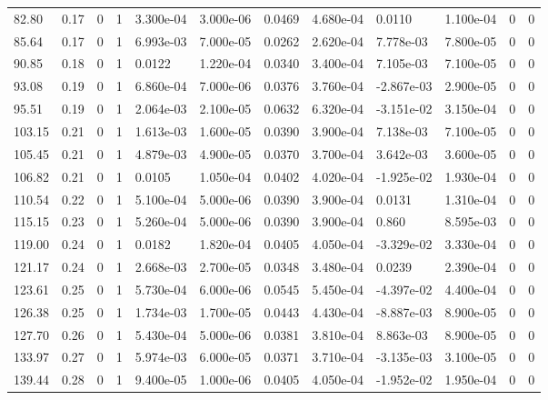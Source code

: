 \documentclass[preview]{standalone}
\begin{document}
{{{{{{{{{{{{{\begin{tabular}{L{1.2cm}C{1.2cm} C{0.3cm}C{0.5cm} C{1.4cm}C{1.4cm} C{1.4cm}C{1.4cm} C{1.6cm}C{1.6cm} C{1.6cm}C{1.6cm}}
  82.80  &  0.17  & 0     &  1 &  3.300e-04  & 3.000e-06  &  0.0469&   4.680e-04& 0.0110 & 1.100e-04   &  0 & 0  \\ 
  85.64  &  0.17  & 0     &  1 &  6.993e-03  & 7.000e-05  &  0.0262&   2.620e-04& 7.778e-03 & 7.800e-05   &  0 & 0  \\ 
  90.85  &  0.18  & 0     &  1 &  0.0122  & 1.220e-04  &  0.0340&   3.400e-04& 7.105e-03 & 7.100e-05   &  0 & 0  \\ 
  93.08  &  0.19  & 0     &  1 &  6.860e-04  & 7.000e-06  &  0.0376&   3.760e-04& -2.867e-03 & 2.900e-05   &  0 & 0  \\ 
  95.51  &  0.19  & 0     &  1 &  2.064e-03  & 2.100e-05  &  0.0632&   6.320e-04& -3.151e-02 & 3.150e-04   &  0 & 0  \\ 
  103.15  &  0.21  & 0     &  1 &  1.613e-03  & 1.600e-05  &  0.0390&   3.900e-04& 7.138e-03 & 7.100e-05   &  0 & 0  \\ 
  105.45  &  0.21  & 0     &  1 &  4.879e-03  & 4.900e-05  &  0.0370&   3.700e-04& 3.642e-03 & 3.600e-05   &  0 & 0  \\ 
  106.82  &  0.21  & 0     &  1 &  0.0105  & 1.050e-04  &  0.0402&   4.020e-04& -1.925e-02 & 1.930e-04   &  0 & 0  \\ 
  110.54  &  0.22  & 0     &  1 &  5.100e-04  & 5.000e-06  &  0.0390&   3.900e-04& 0.0131 & 1.310e-04   &  0 & 0  \\ 
  115.15  &  0.23  & 0     &  1 &  5.260e-04  & 5.000e-06  &  0.0390&   3.900e-04& 0.860 & 8.595e-03   &  0 & 0  \\ 
  119.00  &  0.24  & 0     &  1 &  0.0182  & 1.820e-04  &  0.0405&   4.050e-04& -3.329e-02 & 3.330e-04   &  0 & 0  \\ 
  121.17  &  0.24  & 0     &  1 &  2.668e-03  & 2.700e-05  &  0.0348&   3.480e-04& 0.0239 & 2.390e-04   &  0 & 0  \\ 
  123.61  &  0.25  & 0     &  1 &  5.730e-04  & 6.000e-06  &  0.0545&   5.450e-04& -4.397e-02 & 4.400e-04   &  0 & 0  \\ 
  126.38  &  0.25  & 0     &  1 &  1.734e-03  & 1.700e-05  &  0.0443&   4.430e-04& -8.887e-03 & 8.900e-05   &  0 & 0  \\ 
  127.70  &  0.26  & 0     &  1 &  5.430e-04  & 5.000e-06  &  0.0381&   3.810e-04& 8.863e-03 & 8.900e-05   &  0 & 0  \\ 
  133.97  &  0.27  & 0     &  1 &  5.974e-03  & 6.000e-05  &  0.0371&   3.710e-04& -3.135e-03 & 3.100e-05   &  0 & 0  \\ 
  139.44  &  0.28  & 0     &  1 &  9.400e-05  & 1.000e-06  &  0.0405&   4.050e-04& -1.952e-02 & 1.950e-04   &  0 & 0  \\ 

\end{tabular}}}}}}}}}}}}}}
\end{document}
